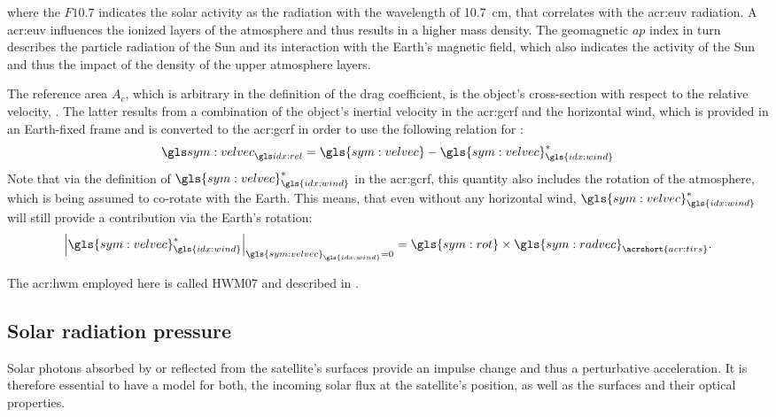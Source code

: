 where the $F10.7$ indicates the solar activity as the radiation with the wavelength of \SI{10.7}{\cm}, that correlates with the \gls{acr:euv} radiation. A \gls{acr:euv} influences the ionized layers of the atmosphere and thus results in a higher mass density. The geomagnetic $ap$ index in turn describes the particle radiation of the Sun and its interaction with the Earth's magnetic field, which also indicates the activity of the Sun and thus the impact of the density of the upper atmosphere layers.

The reference area $A_c$, which is arbitrary in the definition of the drag coefficient, is the object's cross-section with respect to the relative velocity, \relvel. The latter results from a combination of the object's inertial velocity in the \gls{acr:gcrf} and the horizontal wind, which is provided in an Earth-fixed frame and is converted to the \gls{acr:gcrf} in order to use the following relation for \relvel:
\begin{equation}
 \label{eq:relvel}
 \relvel = \gls{sym:velvec}-\gls{sym:velvec}_{\gls{idx:wind}}^{\ast}
\end{equation}
Note that via the definition of $\gls{sym:velvec}_{\gls{idx:wind}}^{\ast}$ in the \gls{acr:gcrf}, this quantity also includes the rotation of the atmosphere,  which is being assumed to co-rotate with the Earth. This means, that even without any horizontal wind, $\gls{sym:velvec}_{\gls{idx:wind}}^{\ast}$ will still provide a contribution via the Earth's rotation:
\begin{equation}
 \label{eq:vw-wo-wind}
 \left|\gls{sym:velvec}_{\gls{idx:wind}}^{\ast}\right|_{\gls{sym:velvec}_{\gls{idx:wind}}=0} 
 = \gls{sym:rot} \times \gls{sym:radvec}_{\acrshort{acr:tirs}}.
\end{equation}

The \gls{acr:hwm} employed here is called HWM07 and described in \citep{drob2008}.

\subsection{Solar radiation pressure}
\label{sec:propagation-state-srp}

Solar photons absorbed by or reflected from the satellite's surfaces provide an impulse change and thus a perturbative acceleration. It is therefore essential to have a model for
both, the incoming solar flux at the satellite's position, as well as the surfaces and their optical properties.

